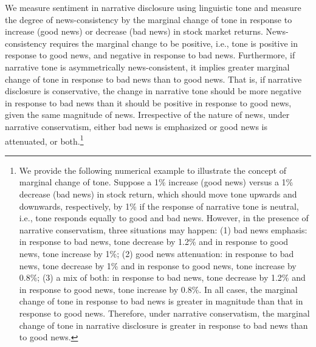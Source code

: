 \documentclass[letterpaper,12pt]{article}
\begin{document}
\begin{spacing}{1.5}
We measure sentiment in narrative disclosure using linguistic tone and measure the degree of news-consistency by the marginal change of tone in response to increase (good news) or decrease (bad news) in stock market returns. News-consistency requires the marginal change to be positive, i.e., tone is positive in response to good news, and negative in response to bad news. Furthermore, if narrative tone is asymmetrically news-consistent, it implies greater marginal change of tone in response to bad news than to good news. That is, if narrative disclosure is conservative, the change in narrative tone should be more negative in response to bad news than it should be positive in response to good news, given the same magnitude of news. Irrespective of the nature of news, under narrative conservatism, either bad news is emphasized or good news is attenuated, or both.\footnote{We provide the following numerical example to illustrate the concept of marginal change of tone. Suppose a 1\% increase (good news) versus a 1\% decrease (bad news) in stock return, which should move tone upwards and downwards, respectively, by 1\% if the response of narrative tone is neutral, i.e., tone responds equally  to good and bad news. However, in the presence of narrative conservatism, three situations may happen: (1) bad news emphasis: in response to bad news, tone decrease by 1.2\% and in response to good news, tone increase by 1\%; (2) good news attenuation: in response to bad news, tone decrease by 1\% and in response to good news, tone increase by 0.8\%; (3) a mix of both: in response to bad news, tone decrease by 1.2\% and in response to good news, tone increase by 0.8\%. In all cases, the marginal change of tone in response to bad news is greater in magnitude than that in response to good news. Therefore, under narrative conservatism, the marginal change of tone in narrative disclosure is greater in response to bad news than to good news.} 


\end{spacing}
\end{document}
